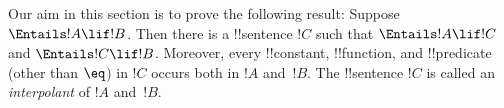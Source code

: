 \documentclass[../../include/open-logic-section]{subfiles}
\begin{document}


Our aim in this section is to prove the following result: Suppose
$\Entails !A \lif !B$. Then there is a !!{sentence} $!C$ such that
$\Entails !A \lif !C$ and $\Entails !C \lif !B$.  Moreover, every
!!{constant}, !!{function}, and !!{predicate} (other than $\eq$) in
$!C$ occurs both in $!A$ and~$!B$. The !!{sentence} $!C$ is called an
\emph{interpolant} of $!A$ and~$!B$.
\end{document}
